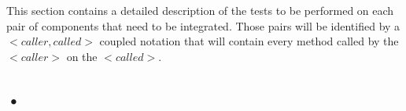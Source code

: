 	This section contains a detailed description of the tests to be performed on each pair of components that need to be integrated. Those pairs will be identified by a $< caller, called >$ coupled notation that will contain every method called by the $< caller >$ on the $< called >$. 

	\subsection{•}